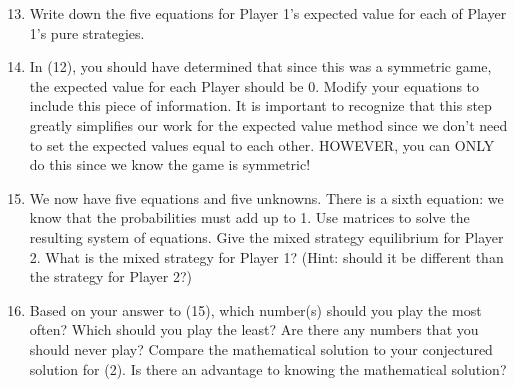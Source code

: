 \begin{enumerate}
\setcounter{enumi}{12}

\item Write down the five equations for Player 1's expected value for each of Player 1's pure strategies.
\vspace{.1 in}

\item In (12), you should have determined that since this was a symmetric game, the expected value for each Player should be 0. Modify your equations to include this piece of information. It is important to recognize that this step greatly simplifies our work for the expected value method since we don't need to set the expected values equal to each other. HOWEVER, you can ONLY do this since we know the game is symmetric!

\vspace{.1 in}

\item We now have five equations and five unknowns. There is a sixth equation: we know that the probabilities must add up to 1. Use matrices to solve the resulting system of equations. Give the mixed strategy equilibrium for Player 2. What is the mixed strategy for Player 1? (Hint: should it be different than the strategy for Player 2?) 

\vspace{.1 in}

\item Based on your answer to (15), which number(s) should you play the most often? Which should you play the least? Are there any numbers that you should never play? Compare the mathematical solution to your conjectured solution for (2). Is there an advantage to knowing the mathematical solution? 

\end{enumerate} 




 